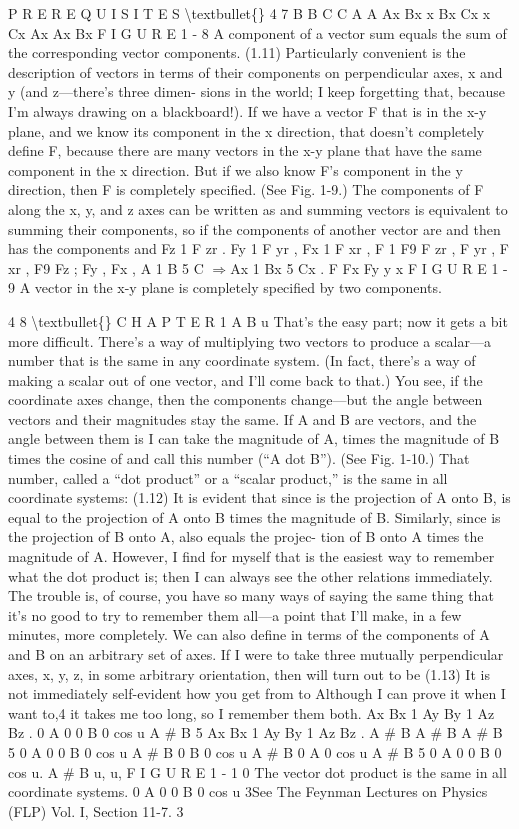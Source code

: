 \documentclass[10pt,oneside]{article}
\begin{document}
P R E R E Q U I S I T E S \textbackslash{}textbullet\{\} 4 7 B B C C A A Ax Bx x Bx Cx x Cx Ax Ax Bx F I G U R E 1 - 8 A component of a vector sum equals the sum of the corresponding vector components. (1.11) Particularly convenient is the description of vectors in terms of their components on perpendicular axes, x and y (and z---there’s three dimen- sions in the world; I keep forgetting that, because I’m always drawing on a blackboard!). If we have a vector F that is in the x-y plane, and we know its component in the x direction, that doesn’t completely define F, because there are many vectors in the x-y plane that have the same component in the x direction. But if we also know F’s component in the y direction, then F is completely specified. (See Fig. 1-9.) The components of F along the x, y, and z axes can be written as and summing vectors is equivalent to summing their components, so if the components of another vector are and then has the components and Fz 1 F zr . Fy 1 F yr  , Fx 1 F xr  , F 1 F9 F zr , F yr  , F xr  , F9 Fz ; Fy , Fx , A 1 B 5 C \ensuremath{\Rightarrow}Ax 1 Bx 5 Cx . F Fx Fy y x F I G U R E 1 - 9 A vector in the x-y plane is completely specified by two components.\par

4 8 \textbackslash{}textbullet\{\} C H A P T E R  1 A B u That’s the easy part; now it gets a bit more difficult. There’s a way of multiplying two vectors to produce a scalar---a number that is the same in any coordinate system. (In fact, there’s a way of making a scalar out of one vector, and I’ll come back to that.) You see, if the coordinate axes change, then the components change---but the angle between vectors and their magnitudes stay the same. If A and B are vectors, and the angle between them is I can take the magnitude of A, times the magnitude of B times the cosine of and call this number (“A dot B”). (See Fig. 1-10.) That number, called a “dot product” or a “scalar product,” is the same in all coordinate systems: (1.12) It is evident that since is the projection of A onto B, is equal to the projection of A onto B times the magnitude of B. Similarly, since is the projection of B onto A, also equals the projec- tion of B onto A times the magnitude of A. However, I find for myself that is the easiest way to remember what the dot product is; then I can always see the other relations immediately. The trouble is, of course, you have so many ways of saying the same thing that it’s no good to try to remember them all---a point that I’ll make, in a few minutes, more completely. We can also define in terms of the components of A and B on an arbitrary set of axes. If I were to take three mutually perpendicular axes, x, y, z, in some arbitrary orientation, then will turn out to be (1.13) It is not immediately self-evident how you get from to Although I can prove it when I want to,4 it takes me too long, so I remember them both. Ax Bx 1 Ay By 1 Az Bz . 0 A 0 0 B 0  cos u A \# B 5 Ax Bx 1 Ay By 1 Az Bz . A \# B A \# B A \# B 5 0 A 0 0 B 0  cos u A \# B 0 B 0  cos u A \# B 0 A 0  cos u A \# B 5 0 A 0 0 B 0  cos u. A \# B u, u, F I G U R E 1 - 1 0 The vector dot product is the same in all coordinate systems. 0 A 0 0 B 0  cos u 3See The Feynman Lectures on Physics (FLP) Vol. I, Section 11-7. 3\par
\end{document}
